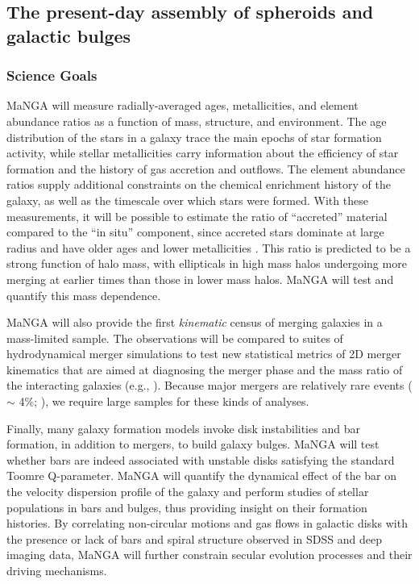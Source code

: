 \documentclass[preprint,11pt]{aastex}
\begin{document}
\subsection{The present-day assembly of spheroids and galactic bulges}
\label{sec:growth_bulges}

\subsubsection{Science Goals}

MaNGA will measure radially-averaged ages, metallicities, and element
abundance ratios as a function of mass, structure, and environment.
The age distribution of the stars in a galaxy trace the main epochs of
star formation activity, while stellar metallicities carry information
about the efficiency of star formation and the history of gas
accretion and outflows. The element abundance ratios supply additional
constraints on the chemical enrichment history of the galaxy, as well
as the timescale over which stars were formed.  With these
measurements, it will be possible to estimate the ratio of
``accreted'' material compared to the ``in situ'' component, since
accreted stars dominate at large radius and have older ages and
lower metallicities \citep{lackner12}. This
ratio is predicted to be a strong function of halo mass, with
ellipticals in high mass halos undergoing more merging at earlier
times than those in lower mass halos.  MaNGA will test and quantify
this mass dependence.

MaNGA will also provide the first {\em kinematic} census of merging
galaxies in a mass-limited sample.  The observations will be compared
to suites of hydrodynamical merger simulations to test new statistical
metrics of 2D merger kinematics that are aimed at diagnosing the
merger phase and the mass ratio of the interacting galaxies (e.g.,
\citealt{bellocchi2012}).  Because major mergers are relatively rare events
($\sim$ 4\%; \citealt{bundy2009}), we require large samples
for these kinds of analyses.

Finally, many galaxy formation models invoke disk instabilities and
bar formation, in addition to mergers, to build galaxy bulges. 
 MaNGA will test whether bars are indeed associated with unstable disks
satisfying the standard Toomre Q-parameter. 
MaNGA will quantify the dynamical effect of the bar on the 
velocity dispersion profile of the galaxy and perform studies of 
stellar populations in bars and bulges, thus providing 
insight on their formation histories.  By correlating non-circular 
motions and gas flows in galactic disks with the presence or lack 
of bars and spiral structure observed in SDSS and deep imaging data, 
MaNGA will further constrain secular evolution processes and their 
driving mechanisms.
\end{document}
